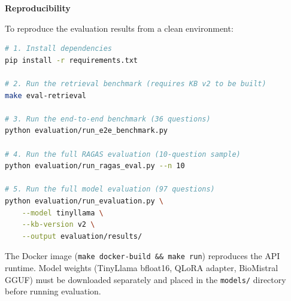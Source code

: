 \vspace{0.5cm}
\noindent\textbf{Reproducibility}

To reproduce the evaluation results from a clean environment:

\begin{lstlisting}[language=bash]
# 1. Install dependencies
pip install -r requirements.txt

# 2. Run the retrieval benchmark (requires KB v2 to be built)
make eval-retrieval

# 3. Run the end-to-end benchmark (36 questions)
python evaluation/run_e2e_benchmark.py

# 4. Run the full RAGAS evaluation (10-question sample)
python evaluation/run_ragas_eval.py --n 10

# 5. Run the full model evaluation (97 questions)
python evaluation/run_evaluation.py \
    --model tinyllama \
    --kb-version v2 \
    --output evaluation/results/
\end{lstlisting}

The Docker image (\texttt{make docker-build\allowbreak{} \&\& make run}) reproduces the API runtime. Model weights (TinyLlama bfloat16, QLoRA adapter, BioMistral GGUF) must be downloaded separately and placed in the \texttt{models/} directory before running evaluation.
